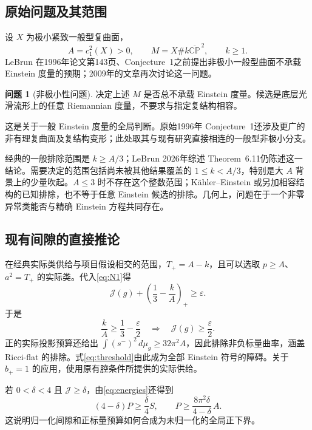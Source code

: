 \documentclass[11pt,a4paper]{article}
\newcommand{\CP}{\mathbb{CP}}
\newcommand{\dd}{\,d\mu_g}
\newcommand{\Ka}{K{\latin\"a}hler}
\theoremstyle{definition}
\newtheorem{problem}{问题}[section]
\numberwithin{equation}{section}
\begin{document}
\subsection{原始问题及其范围}
设 $X$ 为极小紧致一般型复曲面，
\[
A=c_1^2(X)>0,\qquad M=X\#k\overline{\CP}^{\,2},\qquad k\ge1.
\]
LeBrun 在1996年论文第143页、Conjecture~1之前提出非极小一般型曲面不承载 Einstein 度量的预期；2009年的文章再次讨论这一问题\cite{LeBrun1996,LeBrun2009}。

\begin{problem}[非极小性问题]
决定上述 $M$ 是否总不承载 Einstein 度量。候选是底层光滑流形上的任意 Riemannian 度量，不要求与指定复结构相容。
\end{problem}

这是关于一般 Einstein 度量的全局判断。原始1996年 Conjecture~1还涉及更广的非有理复曲面及复结构变形；此处取其与现有研究直接相连的一般型非极小分支。

经典的一般排除范围是 $k\ge A/3$；LeBrun 2026年综述 Theorem~6.11仍陈述这一结论\cite{LeBrun2001,LeBrun2026}。需要决定的范围包括尚未被其他结果覆盖的 $1\le k<A/3$，特别是大 $A$ 背景上的少量吹起。$A\le3$ 时不存在这个整数范围；\Ka{}--Einstein 或另加相容结构的已知排除，也不等于任意 Einstein 候选的排除。几何上，问题在于一个非零异常类能否与精确 Einstein 方程共同存在。

\subsection{现有间隙的直接推论}
在经典实际类供给与项目假设相交的范围，$T_+=A-k$，且可以选取 $p\ge A$、$a^2=T_+$ 的实际类。代入\eqref{eq:N1}得
\begin{equation}
\mathcal J(g)+\left(\frac13-\frac{k}{A}\right)_+\ge\varepsilon.\label{eq:blowgap}
\end{equation}
于是
\begin{equation}
\frac{k}{A}\ge\frac13-\frac\varepsilon2
\quad\Longrightarrow\quad
\mathcal J(g)\ge\frac\varepsilon2.\label{eq:threshold}
\end{equation}
正的实际投影预算还给出 $\int(s^-)^2\dd\ge32\pi^2A$，因此排除非负标量曲率，涵盖 Ricci-flat 的排除。式\eqref{eq:threshold}由此成为全部 Einstein 符号的障碍。关于 $b_+=1$ 的应用，使用原有腔条件所提供的实际供给。

若 $0<\delta<4$ 且 $\mathcal J\ge\delta$，由\eqref{eq:energies}还得到
\begin{equation}
(4-\delta)P\ge\frac\delta4S,
\qquad P\ge\frac{8\pi^2\delta}{4-\delta}\,A.\label{eq:JtoP}
\end{equation}
这说明归一化间隙和正标量预算如何合成为未归一化的全局正下界。
\end{document}
